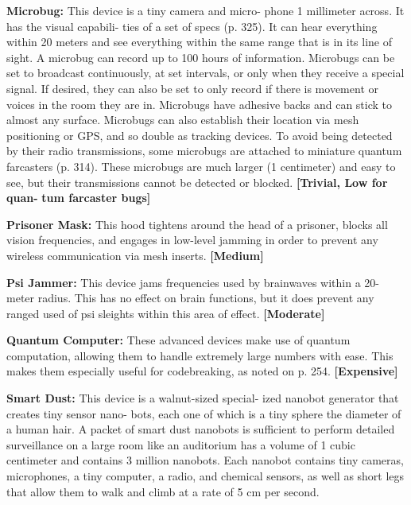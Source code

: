 \textbf{Microbug: }This device is a tiny camera and micro-
phone 1 millimeter across. It has the visual capabili-
ties of a set of specs (p. 325). It can hear everything 
within 20 meters and see everything within the same 
range that is in its line of sight. A microbug can record 
up to 100 hours of information. Microbugs can be 
set to broadcast continuously, at set intervals, or only 
when they receive a special signal. If desired, they 
can also be set to only record if there is movement 
or voices in the room they are in. Microbugs have 
adhesive backs and can stick to almost any surface. 
Microbugs can also establish their location via mesh 
positioning or GPS, and so double as tracking devices. 
To avoid being detected by their radio transmissions, 
some microbugs are attached to miniature quantum 
farcasters (p. 314). These microbugs are much larger 
(1 centimeter) and easy to see, but their transmissions 
cannot be detected or blocked. \textbf{[Trivial, Low for quan-}
\textbf{tum farcaster bugs]}

\textbf{Prisoner Mask:} This hood tightens around the 
head of a prisoner, blocks all vision frequencies, and 
engages in low-level jamming in order to prevent any 
wireless communication via mesh inserts. \textbf{[Medium]}

\textbf{Psi Jammer:} This device jams frequencies used 
by brainwaves within a 20-meter radius. This has 
no effect on brain functions, but it does prevent 
any ranged used of psi sleights within this area of 
effect. \textbf{[Moderate]}

\textbf{Quantum Computer:} These advanced devices 
make use of quantum computation, allowing them 
to handle extremely large numbers with ease. This 
makes them especially useful for codebreaking, as 
noted on p. 254. \textbf{[Expensive]}

\textbf{Smart Dust:} This device is a walnut-sized special-
ized nanobot generator that creates tiny sensor nano-
bots, each one of which is a tiny sphere the diameter 
of a human hair. A packet of smart dust nanobots is 
sufficient to perform detailed surveillance on a large 
room like an auditorium has a volume of 1 cubic 
centimeter and contains 3 million nanobots. Each 
nanobot contains tiny cameras, microphones, a tiny 
computer, a radio, and chemical sensors, as well as 
short legs that allow them to walk and climb at a rate 
of 5 cm per second.

